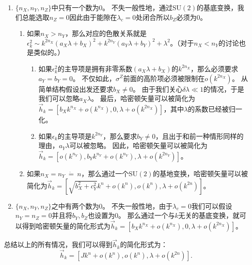 			\begin{enumerate}
				\item $\{n_X,n_Y,n_Z\}$中只有一个数为0。
				不失一般性地，通过SU$(2)$的基底变换，我们总能选取$n_Z=0$因此由于能隙在$\lambda_c = 0$处闭合所以$b_Z$必须为0。
				\begin{enumerate}
					\item 如果$n_X > n_Y$，那么对应的色散关系就是$\epsilon_k^2 \sim k^{2n_X}(a_X \lambda + b_X)^2 + k^{2n_Y}(a_Y \lambda + b_Y)^2 + \lambda^2$。（对于$n_X < n_Y$的讨论也是类似的。）
					\begin{enumerate}
						\item 如果$\epsilon_k^2$的主导项是拥有非零系数$(a_X\lambda+b_X)$的$k^{2n_X}$，那么必须要求$a_Y=b_Y=0$。
						不仅如此，$\sigma^Z$前面的高阶项必须被限制在$o(k^{2n_X})$。
						从简单结构假设出发还要求$b_X\neq0$。
						由于我们关心$\delta\lambda\ll1$的情况，于是我们可以忽略$a_X \lambda$。
						最后，哈密顿矢量可以被简化为$\vec{h}_k = [b_X k^{n_X} + o(k^{n_X}),0,\lambda + o(k^{2n_X})]$，其中$\lambda$的系数已经被归一化。
						\item 如果$\epsilon_k$的主导项是$k^{2n_Y}$，那么要求$b_Y \neq 0$，且出于和前一种情形同样的理由，$a_Y \lambda$可以被忽略。
						因此，哈密顿矢量可以被简化为$\vec{h}_k = [o(k^{n_Y}), b_Y k^{n_Y} + o(k^{n_Y}),\lambda + o(k^{2n_Y})]$。
					\end{enumerate}
					\item 如果$n_X = n_Y \ \dot= \ n$，那么通过一个SU$(2)$的基地变换，哈密顿矢量可以被简化为$\vec{h}_k = [\sqrt{b_X^2+c_Y^2} k^{n} + o(k^{n}), o(k^{n}),\lambda+ o(k^{2n})]$。
				\end{enumerate}
				\item $\{n_X,n_Y,n_Z\}$之中有两个数为0。
				不失一般性地，由于$\lambda_c = 0$我们可以假设$n_Y=n_Z=0$并且将$b_Y,b_Z$也设置为0。
				那么通过一个与$k$无关的基底变换，就可以得到哈密顿矢量的简化形式为$\vec{h}_k = [b_X k^{n_X} + o(k^{n_X}),0,\lambda + o(k^{2n_X})]$。
			\end{enumerate}
			总结以上的所有情况，我们可以得到$\vec{h}_k$的简化形式为：
			\begin{equation} \label{h_k_reduce_1D}
				\vec{h}_k = [J k^{n} + o(k^{n}), o(k^{n}), \lambda + o(k^{2n})].
			\end{equation}
		
